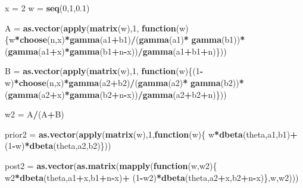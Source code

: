 \documentclass[
]{book}
\newenvironment{Shaded}{\begin{snugshade}}{\end{snugshade}}
\newcommand{\ControlFlowTok}[1]{\textcolor[rgb]{0.13,0.29,0.53}{\textbf{#1}}}
\newcommand{\DecValTok}[1]{\textcolor[rgb]{0.00,0.00,0.81}{#1}}
\newcommand{\FloatTok}[1]{\textcolor[rgb]{0.00,0.00,0.81}{#1}}
\newcommand{\KeywordTok}[1]{\textcolor[rgb]{0.13,0.29,0.53}{\textbf{#1}}}
\newcommand{\NormalTok}[1]{#1}
\newcommand{\OperatorTok}[1]{\textcolor[rgb]{0.81,0.36,0.00}{\textbf{#1}}}
\newcommand{\StringTok}[1]{\textcolor[rgb]{0.31,0.60,0.02}{#1}}
\begin{document}
\begin{Shaded}
\begin{Highlighting}[]
\NormalTok{x =}\StringTok{ }\DecValTok{2}
\NormalTok{w =}\StringTok{ }\KeywordTok{seq}\NormalTok{(}\DecValTok{0}\NormalTok{,}\DecValTok{1}\NormalTok{,}\FloatTok{0.1}\NormalTok{)}

\NormalTok{A =}\StringTok{ }\KeywordTok{as.vector}\NormalTok{(}\KeywordTok{apply}\NormalTok{(}\KeywordTok{matrix}\NormalTok{(w),}\DecValTok{1}\NormalTok{,}
  \ControlFlowTok{function}\NormalTok{(w)\{w}\OperatorTok{*}\KeywordTok{choose}\NormalTok{(n,x)}\OperatorTok{*}\KeywordTok{gamma}\NormalTok{(a1}\OperatorTok{+}\NormalTok{b1)}\OperatorTok{/}\NormalTok{(}\KeywordTok{gamma}\NormalTok{(a1)}\OperatorTok{*}
\StringTok{    }\KeywordTok{gamma}\NormalTok{(b1))}\OperatorTok{*}\NormalTok{(}\KeywordTok{gamma}\NormalTok{(a1}\OperatorTok{+}\NormalTok{x)}\OperatorTok{*}\KeywordTok{gamma}\NormalTok{(b1}\OperatorTok{+}\NormalTok{n}\OperatorTok{-}\NormalTok{x))}\OperatorTok{/}\KeywordTok{gamma}\NormalTok{(a1}\OperatorTok{+}\NormalTok{b1}\OperatorTok{+}\NormalTok{n)\}))}

\NormalTok{B =}\StringTok{ }\KeywordTok{as.vector}\NormalTok{(}\KeywordTok{apply}\NormalTok{(}\KeywordTok{matrix}\NormalTok{(w),}\DecValTok{1}\NormalTok{,}
  \ControlFlowTok{function}\NormalTok{(w)\{(}\DecValTok{1}\OperatorTok{-}\NormalTok{w)}\OperatorTok{*}\KeywordTok{choose}\NormalTok{(n,x)}\OperatorTok{*}\KeywordTok{gamma}\NormalTok{(a2}\OperatorTok{+}\NormalTok{b2)}\OperatorTok{/}\NormalTok{(}\KeywordTok{gamma}\NormalTok{(a2)}\OperatorTok{*}
\StringTok{    }\KeywordTok{gamma}\NormalTok{(b2))}\OperatorTok{*}\NormalTok{(}\KeywordTok{gamma}\NormalTok{(a2}\OperatorTok{+}\NormalTok{x)}\OperatorTok{*}\KeywordTok{gamma}\NormalTok{(b2}\OperatorTok{+}\NormalTok{n}\OperatorTok{-}\NormalTok{x))}\OperatorTok{/}\KeywordTok{gamma}\NormalTok{(a2}\OperatorTok{+}\NormalTok{b2}\OperatorTok{+}\NormalTok{n)\}))}

\NormalTok{w2 =}\StringTok{ }\NormalTok{A}\OperatorTok{/}\NormalTok{(A}\OperatorTok{+}\NormalTok{B)}

\NormalTok{prior2 =}\StringTok{ }\KeywordTok{as.vector}\NormalTok{(}\KeywordTok{apply}\NormalTok{(}\KeywordTok{matrix}\NormalTok{(w),}\DecValTok{1}\NormalTok{,}\ControlFlowTok{function}\NormalTok{(w)\{}
\NormalTok{  w}\OperatorTok{*}\KeywordTok{dbeta}\NormalTok{(theta,a1,b1)}\OperatorTok{+}\NormalTok{(}\DecValTok{1}\OperatorTok{-}\NormalTok{w)}\OperatorTok{*}\KeywordTok{dbeta}\NormalTok{(theta,a2,b2)\}))}

\NormalTok{post2 =}\StringTok{ }\KeywordTok{as.vector}\NormalTok{(}\KeywordTok{as.matrix}\NormalTok{(}\KeywordTok{mapply}\NormalTok{(}\ControlFlowTok{function}\NormalTok{(w,w2)\{}
\NormalTok{  w2}\OperatorTok{*}\KeywordTok{dbeta}\NormalTok{(theta,a1}\OperatorTok{+}\NormalTok{x,b1}\OperatorTok{+}\NormalTok{n}\OperatorTok{-}\NormalTok{x)}\OperatorTok{+}
\StringTok{  }\NormalTok{(}\DecValTok{1}\OperatorTok{-}\NormalTok{w2)}\OperatorTok{*}\KeywordTok{dbeta}\NormalTok{(theta,a2}\OperatorTok{+}\NormalTok{x,b2}\OperatorTok{+}\NormalTok{n}\OperatorTok{-}\NormalTok{x)\},w,w2)))}


\end{Highlighting}
\end{Shaded}
\end{document}
